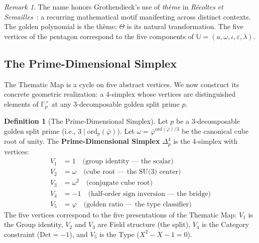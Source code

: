 \documentclass[12pt,oneside]{article}
\theoremstyle{principia}
\theoremstyle{definition}
\newtheorem{definition}[theorem]{Definition}
\theoremstyle{remark}
\newtheorem{remark}[theorem]{Remark}
\providecommand{\UU}{\mathbb{U}}
\providecommand{\FF}{\mathbb{F}}
\providecommand{\vp}{\varphi}
\providecommand{\vpbar}{\bar{\varphi}}
\providecommand{\eps}{\varepsilon}
\providecommand{\lam}{\lambda}
\begin{document}
\begin{remark}
The name honors Grothendieck's use of \emph{th\`eme} in \emph{R\'ecoltes et Semailles}~\cite{grothendieck-rs}: a recurring mathematical motif manifesting across distinct contexts. The golden polynomial is the th\`eme; $\Theta$ is its natural transformation. The five vertices of the pentagon correspond to the five components of $\UU = (a, \omega, \iota, \eps, \lam)$.
\end{remark}

\subsection{The Prime-Dimensional Simplex}

The Thematic Map is a cycle on five abstract vertices. We now construct its concrete geometric realization: a 4-simplex whose vertices are distinguished elements of $\FF_p^\times$ at any 3-decomposable golden split prime $p$.

\begin{definition}[The Prime-Dimensional Simplex]\label{def:simplex}
Let $p$ be a 3-decomposable golden split prime (i.e., $3 \mid \mathrm{ord}_p(\vpbar)$). Let $\omega = \vpbar^{\mathrm{ord}(\vpbar)/3}$ be the canonical cube root of unity. The \textbf{Prime-Dimensional Simplex} $\Delta^4_p$ is the 4-simplex with vertices:
\begin{align}
V_1 &= 1 \quad \text{(group identity --- the scalar)} \\
V_2 &= \omega \quad \text{(cube root --- the SU(3) center)} \\
V_3 &= \omega^2 \quad \text{(conjugate cube root)} \\
V_4 &= -1 \quad \text{(half-order sign inversion --- the bridge)} \\
V_5 &= \vp \quad \text{(golden ratio --- the type classifier)}
\end{align}
The five vertices correspond to the five presentations of the Thematic Map: $V_1$ is the Group identity, $V_2$ and $V_3$ are Field structure (the split), $V_4$ is the Category constraint ($\mathrm{Det} = -1$), and $V_5$ is the Type ($X^2 - X - 1 = 0$).
\end{definition}
\end{document}
